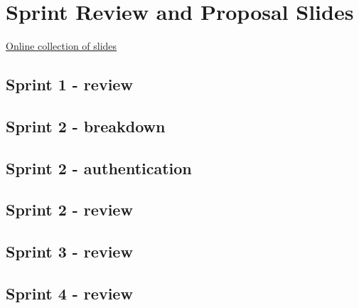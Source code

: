 
\chapter{Sprint Review and Proposal Slides}
\label{appendix:slides}

\href{https://goo.gl/BR75HN}{Online collection of slides}

\section{Sprint 1 - review}
\label{appendix:slides_1}


\section{Sprint 2 - breakdown}
\label{appendix:slides_2_breakdown}


\section{Sprint 2 - authentication}
\label{appendix:slides_2_authentication}


\section{Sprint 2 - review}
\label{appendix:slides_2}


\section{Sprint 3 - review}
\label{appendix:slides_3}


\section{Sprint 4 - review}
\label{appendix:slides_4}

